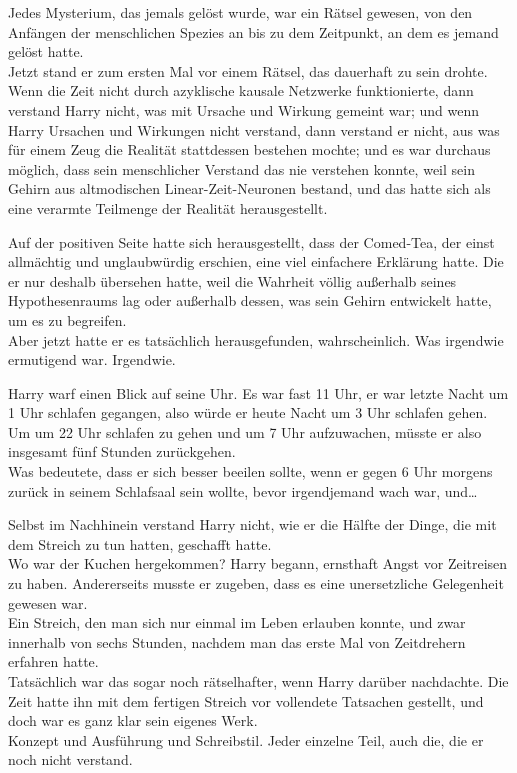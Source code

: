 {Jedes Mysterium, das jemals gelöst wurde, war ein Rätsel gewesen, von den Anfängen der menschlichen Spezies an bis zu dem Zeitpunkt, an dem es jemand gelöst hatte.\\ Jetzt stand er zum ersten Mal vor einem Rätsel, das dauerhaft zu sein drohte. Wenn die Zeit nicht durch azyklische kausale Netzwerke funktionierte, dann verstand Harry nicht, was mit Ursache und Wirkung gemeint war; und wenn Harry Ursachen und Wirkungen nicht verstand, dann verstand er nicht, aus was für einem Zeug die Realität stattdessen bestehen mochte; und es war durchaus möglich, dass sein menschlicher Verstand das nie verstehen konnte, weil sein Gehirn aus altmodischen Linear-Zeit-Neuronen bestand, und das hatte sich als eine verarmte Teilmenge der Realität herausgestellt.

Auf der positiven Seite hatte sich herausgestellt, dass der Comed-Tea, der einst allmächtig und unglaubwürdig erschien, eine viel einfachere Erklärung hatte. Die er nur deshalb übersehen hatte, weil die Wahrheit völlig außerhalb seines Hypothesenraums lag oder außerhalb dessen, was sein Gehirn entwickelt hatte, um es zu begreifen.\\ Aber jetzt hatte er es tatsächlich herausgefunden, wahrscheinlich. Was irgendwie ermutigend war. Irgendwie.

Harry warf einen Blick auf seine Uhr. Es war fast 11 Uhr, er war letzte Nacht um 1 Uhr schlafen gegangen, also würde er heute Nacht um 3 Uhr schlafen gehen.\\ Um um 22 Uhr schlafen zu gehen und um 7 Uhr aufzuwachen, müsste er also insgesamt fünf Stunden zurückgehen.\\ Was bedeutete, dass er sich besser beeilen sollte, wenn er gegen 6 Uhr morgens zurück in seinem Schlafsaal sein wollte, bevor irgendjemand wach war, und…

Selbst im Nachhinein verstand Harry nicht, wie er die Hälfte der Dinge, die mit dem Streich zu tun hatten, geschafft hatte.\\ Wo war der Kuchen hergekommen? Harry begann, ernsthaft Angst vor Zeitreisen zu haben. Andererseits musste er zugeben, dass es eine unersetzliche Gelegenheit gewesen war.\\ Ein Streich, den man sich nur einmal im Leben erlauben konnte, und zwar innerhalb von sechs Stunden, nachdem man das erste Mal von Zeitdrehern erfahren hatte.\\ Tatsächlich war das sogar noch rätselhafter, wenn Harry darüber nachdachte. Die Zeit hatte ihn mit dem fertigen Streich vor vollendete Tatsachen gestellt, und doch war es ganz klar sein eigenes Werk.\\ Konzept und Ausführung und Schreibstil. Jeder einzelne Teil, auch die, die er noch nicht verstand.

}
